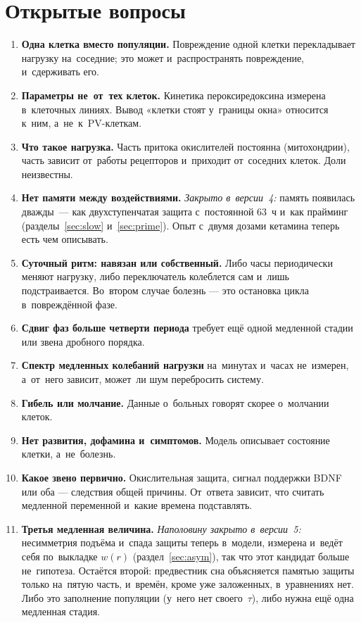 \documentclass[11pt,a4paper,landscape,twocolumn]{article}
\begin{document}
\section{Открытые вопросы}\label{sec:crit}
\begin{enumerate}
\item \textbf{Одна клетка вместо популяции.} Повреждение одной клетки перекладывает нагрузку на~соседние; это может и~распространять повреждение, и~сдерживать его.
\item \textbf{Параметры не~от~тех клеток.} Кинетика пероксиредоксина измерена в~клеточных линиях. Вывод «клетки стоят у~границы окна» относится к~ним, а~не~к~PV-клеткам.
\item \textbf{Что такое нагрузка.} Часть притока окислителей постоянна (митохондрии), часть зависит от~работы рецепторов и~приходит от~соседних клеток. Доли неизвестны.
\item \textbf{Нет памяти между воздействиями.} \emph{Закрыто в~версии~4:} память появилась дважды~— как двухступенчатая защита с~постоянной 63~ч и~как прайминг (разделы~\ref{sec:slow} и~\ref{sec:prime}). Опыт с~двумя дозами кетамина теперь есть чем описывать.
\item \textbf{Суточный ритм: навязан или собственный.} Либо часы периодически меняют нагрузку, либо переключатель колеблется сам и~лишь подстраивается. Во~втором случае болезнь — это остановка цикла в~повреждённой фазе.
\item \textbf{Сдвиг фаз больше четверти периода} требует ещё одной медленной стадии или звена дробного порядка.
\item \textbf{Спектр медленных колебаний нагрузки} на~минутах и~часах не~измерен, а~от~него зависит, может~ли шум перебросить систему.
\item \textbf{Гибель или молчание.} Данные о~больных говорят скорее о~молчании клеток.
\item \textbf{Нет развития, дофамина и~симптомов.} Модель описывает состояние клетки, а~не~болезнь.
\item \textbf{Какое звено первично.} Окислительная защита, сигнал поддержки BDNF или оба — следствия общей причины. От~ответа зависит, что считать медленной переменной и~какие времена подставлять.
\item \textbf{Третья медленная величина.} \emph{Наполовину закрыто в~версии~5:} несимметрия подъёма и~спада защиты теперь в~модели, измерена и~ведёт себя по~выкладке $w(r)$ (раздел~\ref{sec:asym}), так что этот кандидат больше не~гипотеза. Остаётся второй: предвестник сна объясняется памятью защиты только на~пятую часть, и~времён, кроме уже заложенных, в~уравнениях нет. Либо это заполнение популяции (у~него нет своего~$\tau$), либо нужна ещё одна медленная стадия.

\end{enumerate}
\end{document}
